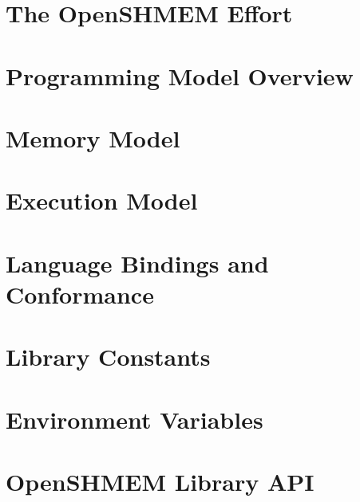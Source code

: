 \documentclass[10pt]{book}
\begin{document}




\section{The OpenSHMEM Effort}\label{subsec:openshmem_effort}


\section{Programming Model Overview}\label{subsec:programming_model}


\section{Memory Model}\label{subsec:memory_model}


\section{Execution Model}\label{subsec:execution_model}


\section{Language Bindings and Conformance}\label{subsec:bindings}


\section{Library Constants}\label{subsec:library_constants}


\section{Environment Variables }\label{subsec:environment_variables}





\clearpage



\section{OpenSHMEM Library API}\label{sec:openshmem_library_api}
\end{document}
